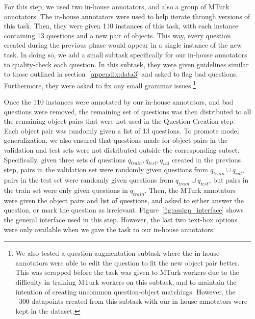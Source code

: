\documentclass[runningheads]{llncs}
\begin{document}
For this step, we used two in-house annotators, and also a group of MTurk annotators. The in-house annotators were used to help iterate through versions of this task. Then, they were given 110 instances of this task, with each instance containing 13 questions and a new pair of objects. This way, every question created during the previous phase would appear in a single instance of the new task. In doing so, we add a small subtask specifically for our in-house annotators to quality-check each question. In this subtask, they were given guidelines similar to those outlined in section~\ref{appendix:data3} and asked to flag bad questions. Furthermore, they were asked to fix any small grammar issues.\footnote{We also tested a question augmentation subtask where the in-house annotators were able to edit the question to fit the new object pair better. This was scrapped before the task was given to MTurk workers due to the difficulty in training MTurk workers on this subtask, and to maintain the intention of creating uncommon question-object matchings. However, the ~300 datapoints created from this subtask with our in-house annotators were kept in the dataset.}

Once the 110 instances were annotated by our in-house annotators, and bad questions were removed, the remaining set of  questions was then distributed to all the remaining  object pairs that were not used in the Question Creation step. Each object pair was randomly given a list of 13 questions. To promote model generalization, we also ensured that questions made for object pairs in the validation and test sets were not distributed outside the corresponding subset. Specifically, given three sets of questions $q_{train}, q_{test}, q_{val}$ created in the previous step, pairs in the validation set were randomly given questions from $q_{train} \cup q_{val}$, pairs in the test set were randomly given questions from $q_{train} \cup q_{test}$, but pairs in the train set were only given questions in $q_{train}$. Then, the MTurk annotators were given the object pairs and list of questions, and asked to either answer the question, or mark the question as irrelevant. Figure~\ref{fig:assign_interface} shows the general interface used in this step. However, the last two text-box options were only available when we gave the task to our in-house annotators. 
\end{document}
